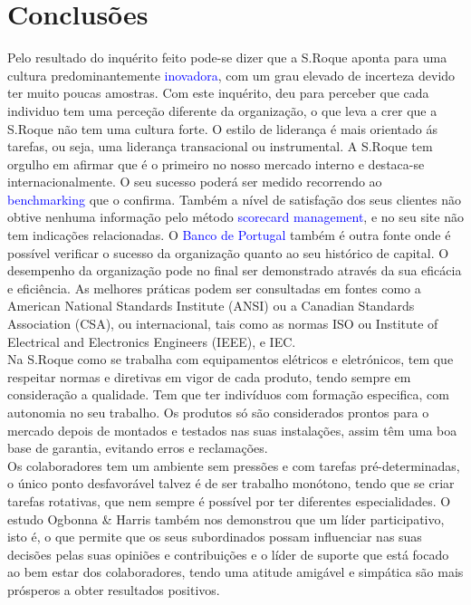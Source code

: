 \section{Conclusões}
\qquad Pelo resultado do inquérito feito pode-se dizer que a S.Roque aponta para uma cultura predominantemente \textcolor{blue}{inovadora}, com um grau elevado de incerteza devido ter muito poucas amostras. Com este inquérito, deu para perceber que cada individuo tem uma perceção diferente da organização, o que leva a crer que a S.Roque não tem uma cultura forte. O estilo de liderança é mais orientado ás tarefas, ou seja, uma liderança transacional ou instrumental.
\emptyline
A S.Roque tem orgulho em afirmar que é o primeiro no nosso mercado interno e destaca-se internacionalmente. O seu sucesso poderá ser medido recorrendo ao \textcolor{blue}{benchmarking} que o confirma. Também a nível de satisfação dos seus clientes não obtive nenhuma informação pelo método \textcolor{blue}{scorecard management}, e no seu site não tem indicações relacionadas. O \textcolor{blue}{Banco de Portugal} também é outra fonte onde é possível verificar o sucesso da organização quanto ao seu histórico de capital. O desempenho da organização pode no final ser demonstrado através da sua eficácia e eficiência.
\emptyline
As melhores práticas podem ser consultadas em fontes como a American National Standards Institute (ANSI) ou a Canadian Standards Association (CSA), ou internacional, tais como as normas ISO ou Institute of Electrical and Electronics Engineers (IEEE), e IEC.\\
Na S.Roque como se trabalha com equipamentos elétricos e eletrónicos, tem que respeitar normas e diretivas em vigor de cada produto, tendo sempre em consideração a qualidade. Tem que ter indivíduos com formação especifica, com autonomia no seu trabalho. Os produtos só são considerados prontos para o mercado depois de montados e testados nas suas instalações, assim têm uma boa base de garantia, evitando erros e reclamações.\\
Os colaboradores tem um ambiente sem pressões e com tarefas pré-determinadas, o único ponto desfavorável talvez é de ser trabalho monótono, tendo que se criar tarefas rotativas, que nem sempre é possível por ter diferentes especialidades.
\emptyline
O estudo Ogbonna \& Harris também nos demonstrou que um líder participativo, isto é, o que permite que os seus subordinados possam influenciar nas suas decisões pelas suas opiniões e contribuições e o líder de suporte que está focado ao bem estar dos colaboradores, tendo uma atitude amigável e simpática são mais prósperos a obter resultados positivos.\\
